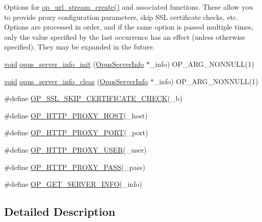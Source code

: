 Options for \hyperlink{group__stream__callbacks_ga5c588fac7542057282b50a5bd2dbb35a}{op\+\_\+url\+\_\+stream\+\_\+create()} and associated functions. These allow you to provide proxy configuration parameters, skip S\+SL certificate checks, etc. Options are processed in order, and if the same option is passed multiple times, only the value specified by the last occurrence has an effect (unless otherwise specified). They may be expanded in the future. \begin{DoxyCompactItemize}
\item 
\hyperlink{png_8h_ac9c84fa68bbad002983e35ce3663c686}{void} \hyperlink{group__url__options_ga8a8c97266e46504e064bba1a70495738}{opus\+\_\+server\+\_\+info\+\_\+init} (\hyperlink{struct_opus_server_info}{Opus\+Server\+Info} $\ast$\+\_\+info) O\+P\+\_\+\+A\+R\+G\+\_\+\+N\+O\+N\+N\+U\+LL(1)
\item 
\hyperlink{png_8h_ac9c84fa68bbad002983e35ce3663c686}{void} \hyperlink{group__url__options_ga096536e460277fe890acb265d8fdbd63}{opus\+\_\+server\+\_\+info\+\_\+clear} (\hyperlink{struct_opus_server_info}{Opus\+Server\+Info} $\ast$\+\_\+info) O\+P\+\_\+\+A\+R\+G\+\_\+\+N\+O\+N\+N\+U\+LL(1)
\item 
\#define \hyperlink{group__url__options_ga71080150b55e223be2710a0307108b72}{O\+P\+\_\+\+S\+S\+L\+\_\+\+S\+K\+I\+P\+\_\+\+C\+E\+R\+T\+I\+F\+I\+C\+A\+T\+E\+\_\+\+C\+H\+E\+CK}(\+\_\+b)
\item 
\#define \hyperlink{group__url__options_gab3b517acdb74c0d0b51800af86a58876}{O\+P\+\_\+\+H\+T\+T\+P\+\_\+\+P\+R\+O\+X\+Y\+\_\+\+H\+O\+ST}(\+\_\+host)
\item 
\#define \hyperlink{group__url__options_ga838d23878f4135691684203baa75ed0c}{O\+P\+\_\+\+H\+T\+T\+P\+\_\+\+P\+R\+O\+X\+Y\+\_\+\+P\+O\+RT}(\+\_\+port)
\item 
\#define \hyperlink{group__url__options_gaf0ce8d761ff48697fa0c44a62a445842}{O\+P\+\_\+\+H\+T\+T\+P\+\_\+\+P\+R\+O\+X\+Y\+\_\+\+U\+S\+ER}(\+\_\+user)
\item 
\#define \hyperlink{group__url__options_gaad96c33557407e406cca89477b2e7892}{O\+P\+\_\+\+H\+T\+T\+P\+\_\+\+P\+R\+O\+X\+Y\+\_\+\+P\+A\+SS}(\+\_\+pass)
\item 
\#define \hyperlink{group__url__options_gacc2e4b086bee832d5d66caf18fd7d659}{O\+P\+\_\+\+G\+E\+T\+\_\+\+S\+E\+R\+V\+E\+R\+\_\+\+I\+N\+FO}(\+\_\+info)
\end{DoxyCompactItemize}


\subsection{Detailed Description}



